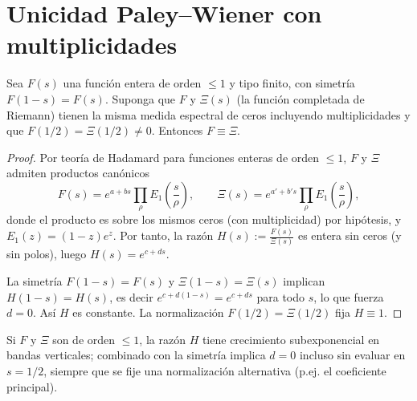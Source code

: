 \section{Unicidad Paley--Wiener con multiplicidades}

\begin{theorem}
Sea $F(s)$ una función entera de orden $\le 1$ y tipo finito, con simetría $F(1-s)=F(s)$.
Suponga que $F$ y $\Xi(s)$ (la función completada de Riemann) tienen la misma medida
espectral de ceros incluyendo multiplicidades y que $F(1/2)=\Xi(1/2)\neq 0$.
Entonces $F\equiv \Xi$.
\end{theorem}

\begin{proof}
Por teoría de Hadamard para funciones enteras de orden $\le 1$, $F$ y $\Xi$
admiten productos canónicos
\[
F(s)=e^{a+bs}\prod_\rho E_1\!\left(\frac{s}{\rho}\right),\qquad
\Xi(s)=e^{a'+b's}\prod_\rho E_1\!\left(\frac{s}{\rho}\right),
\]
donde el producto es sobre los mismos ceros (con multiplicidad) por hipótesis,
y $E_1(z)=(1-z)e^{z}$.
Por tanto, la razón $H(s):=\frac{F(s)}{\Xi(s)}$ es entera sin ceros (y sin polos), luego $H(s)=e^{c+ds}$.

La simetría $F(1-s)=F(s)$ y $\Xi(1-s)=\Xi(s)$ implican
$H(1-s)=H(s)$, es decir $e^{c+d(1-s)}=e^{c+ds}$ para todo $s$, lo que fuerza $d=0$.
Así $H$ es constante. La normalización $F(1/2)=\Xi(1/2)$ fija $H\equiv 1$.
\end{proof}

\begin{lemma}
Si $F$ y $\Xi$ son de orden $\le 1$, la razón $H$ tiene crecimiento subexponencial en bandas verticales; combinado con la simetría implica $d=0$ incluso sin evaluar en $s=1/2$, siempre que se fije una normalización alternativa (p.ej. el coeficiente principal).
\end{lemma}
